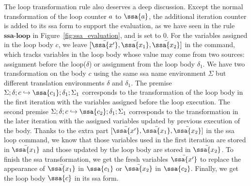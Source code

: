 The loop transformation rule also deserves a deep discussion. Except the normal transformation of the loop counter $a$ to $\ssa{\aexpr}$, the additional iteration counter is added to its ssa form to support the evaluation, as we have seen in the rule $\textbf{ssa-loop}$ in Figure~\ref{fig:ssa_evaluation}, and is set to $0$. For the variables assigned in the loop body $c$, we leave $ [\bar{\ssa{x'}}, \bar{\ssa{x_1}}, \bar{\ssa{x_2}}]$ in the command, which tracks variables in the loop body whose value may come from two sources: assignment before the loop($\delta$) or assignment from the loop body $\delta_1$. We have two transformation on the body $c$ using the same ssa name environment $\Sigma$ but different translation environments $\delta$ and $\delta_1$. The premise $\Sigma; \delta; c \hookrightarrow \ssa{c_1}; \delta_1 ; \Sigma_1 $ corresponds to the transformation of the loop body in the first iteration with the variables assigned before the loop execution. The second premise $\Sigma; \delta; c \hookrightarrow \ssa{c_2}; \delta_1 ; \Sigma_1 $ corresponds to the transformation in the later iteration with the assigned variables updated by previous execution of the body. Thanks to the extra part $ [\bar{\ssa{x'}}, \bar{\ssa{x_1}}, \bar{\ssa{x_2}}]$ in the ssa loop command, we know that those variables used in the first iteration are stored in $\bar{\ssa{x_1}}$ and those updated by the loop body are stored in $\bar{\ssa{x_2}}$. To finish the ssa transformation, we get the fresh variables $\bar{\ssa{x'}}$ to replace the appearance of $\bar{\ssa{x_1}}$ in  $\ssa{c_1}$ or $\bar{\ssa{x_2}}$ in $\ssa{c_2}$. Finally, we get the loop body $\ssa{c}$ in its ssa form.







